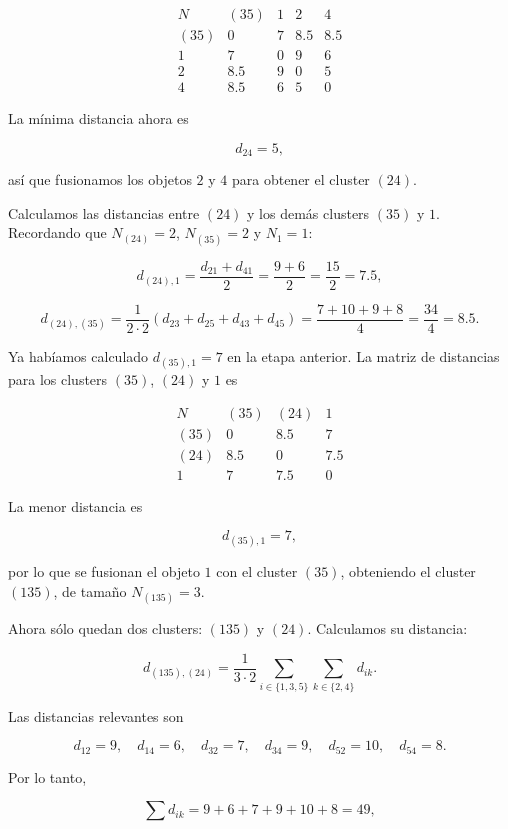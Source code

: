 \documentclass[
]{book}
\begin{document}
\[
\begin{array}{c|cccc}
  N   & (35) & 1 & 2 & 4 \\\hline
(35) & 0   & 7   & 8.5 & 8.5 \\
1    & 7   & 0   & 9   & 6   \\
2    & 8.5 & 9   & 0   & 5   \\
4    & 8.5 & 6   & 5   & 0
\end{array}
\]

La mínima distancia ahora es

\[
d_{24} = 5,
\]

así que fusionamos los objetos \(2\) y \(4\) para obtener el cluster \((24)\).

Calculamos las distancias entre \((24)\) y los demás clusters \((35)\) y \(1\).
Recordando que \(N_{(24)} = 2\), \(N_{(35)} = 2\) y \(N_1 = 1\):

\[
d_{(24),1}
= \frac{d_{21} + d_{41}}{2}
= \frac{9 + 6}{2}
= \frac{15}{2} = 7.5,
\]

\[
d_{(24),(35)}
= \frac{1}{2\cdot 2}
\left(
d_{23} + d_{25} + d_{43} + d_{45}
\right)
= \frac{7 + 10 + 9 + 8}{4}
= \frac{34}{4} = 8.5.
\]

Ya habíamos calculado \(d_{(35),1} = 7\) en la etapa anterior. La matriz
de distancias para los clusters \((35)\), \((24)\) y \(1\) es

\[
\begin{array}{c|ccc}
  N   & (35) & (24) & 1 \\
\hline
(35) & 0   & 8.5  & 7   \\
(24) & 8.5 & 0    & 7.5 \\
1    & 7   & 7.5  & 0
\end{array}
\]

La menor distancia es

\[
d_{(35),1} = 7,
\]

por lo que se fusionan el objeto \(1\) con el cluster \((35)\), obteniendo
el cluster \((135)\), de tamaño \(N_{(135)}=3\).

Ahora sólo quedan dos clusters: \((135)\) y \((24)\). Calculamos su distancia:

\[
d_{(135),(24)}
= \frac{1}{3\cdot 2}
\sum_{i \in \{1,3,5\}} \sum_{k \in \{2,4\}} d_{ik}.
\]

Las distancias relevantes son

\[
d_{12}=9,\quad d_{14}=6,\quad
d_{32}=7,\quad d_{34}=9,\quad
d_{52}=10,\quad d_{54}=8.
\]

Por lo tanto,

\[
\sum d_{ik} = 9 + 6 + 7 + 9 + 10 + 8 = 49,
\]
\end{document}
